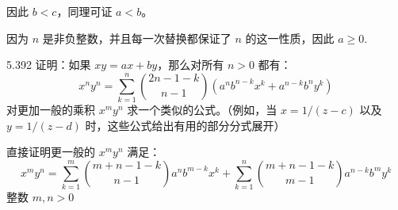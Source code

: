 因此 \( b < c \)，同理可证 \( a < b \)。

因为 \( n \) 是非负整数，并且每一次替换都保证了 \( n \) 的这一性质，因此 \( a \ge 0 \).

\begin{problem}{5.39}{2}
  证明：如果 \( xy = ax + by \)，那么对所有 \( n > 0 \) 都有：
  \[
    x^n y^n = \sum_{k=1}^n \binom{2n-1-k}{n-1} (a^n b^{n-k} x^k + a^{n-k} b^n y^k)
  \]
  对更加一般的乘积 \( x^m y^n \) 求一个类似的公式。（例如，当 \( x=1/(z-c) \) 以及 \( y=1/(z-d) \) 时，这些公式给出有用的部分分式展开）
\end{problem}

直接证明更一般的 \( x^m y^n \) 满足：
\[
  x^m y^n = \sum_{k=1}^m \binom{m+n-1-k}{n-1} a^n b^{m-k} x^k + \sum_{k=1}^n \binom{m+n-1-k}{m-1} a^{n-k} b^m y^k
\]
整数 \( m, n > 0 \)

